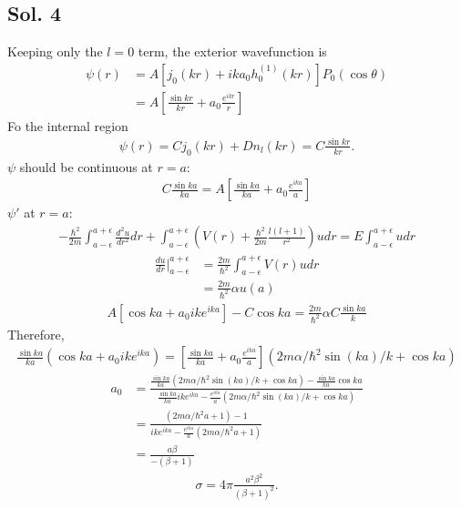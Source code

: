 \subsection*{Sol. 4}
Keeping only the $l=0$ term, the exterior wavefunction is
\begin{align*}
    \psi(r) & =
    A[j_0(kr) + ika_0h_0^{(1)}(kr)]P_0(\cos\theta) \\
            & =
    A[\frac{\sin kr}{kr} + a_0\frac{e^{ikr}}{r}]
\end{align*}
Fo the internal region
\begin{align*}
    \psi(r) = Cj_0(kr) + Dn_l(kr) = C\frac{\sin kr}{kr}.
\end{align*}
$\psi$ should be continuous at $r=a$:
\begin{align*}
    C\frac{\sin ka}{ka} =
    A[\frac{\sin ka}{ka} + a_0\frac{e^{ika}}{a}]
\end{align*}
$\psi'$ at $r=a$:
\begin{align*}
    -\frac{\hbar^2}{2m}
    \int_{a-\epsilon}^{a+\epsilon}
    \frac{d^2u}{dr^2}
    dr
    +
    \int_{a-\epsilon}^{a+\epsilon}
    (V(r) + \frac{\hbar^2}{2m}\frac{l(l+1)}{r^2})udr
    =
    E\int_{a-\epsilon}^{a+\epsilon}udr
\end{align*}
\begin{align*}
    \frac{du}{dr}\bigg|^{a+\epsilon}_{a-\epsilon}
     & =\frac{2m}{\hbar^2}\int_{a-\epsilon}^{a+\epsilon}V(r)udr \\
     & =\frac{2m}{\hbar^2}\alpha u(a)
\end{align*}
\begin{align*}
    A[\cos ka + a_0ike^{ika}] -
    C\cos ka = \frac{2m}{\hbar^2}\alpha
    C\frac{\sin ka}{k}
\end{align*}
Therefore,
\begin{align*}
    \frac{\sin ka}{ka}(\cos ka + a_0 ik e^{ika}) =
    [\frac{\sin ka}{ka} + a_0\frac{e^{ika}}{a}]
    (2m\alpha/\hbar^2 \sin (ka)/k+\cos ka)
\end{align*}
\begin{align*}
    a_0 & = \frac{\frac{\sin ka}{ka}(2m\alpha/\hbar^2 \sin (ka)/k+\cos ka)-\frac{\sin ka}{ka}\cos ka }
            {\frac{\sin ka}{ka} ike^{ika}-\frac{e^{ika}}{a}(2m\alpha/\hbar^2 \sin (ka)/k+\cos ka)} \\
        & =
    \frac{(2m\alpha/\hbar^2 a+1)-1 }
    {ike^{ika}-\frac{e^{ika}}{a}(2m\alpha/\hbar^2 a+1)} \\
        & =
    \frac{a\beta}{-(\beta+1)}
\end{align*}
\begin{align*}
    \sigma = 4\pi \frac{a^2\beta^2}{(\beta+1)^2}.
\end{align*}


